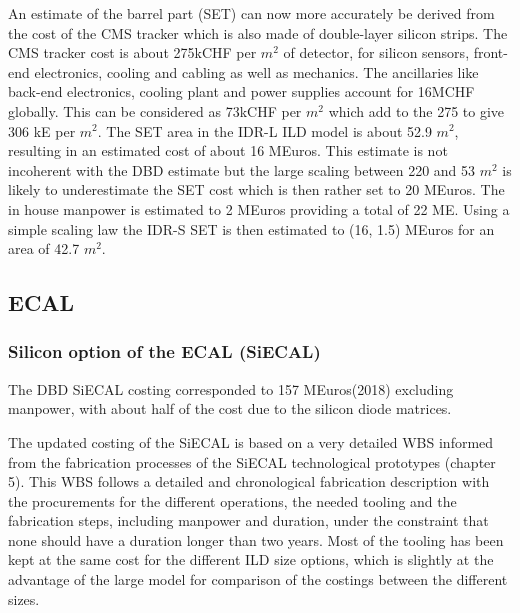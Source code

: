 An estimate of the barrel part (SET) can now more accurately be derived from the cost of the CMS tracker which is also made of double-layer silicon strips. The CMS tracker cost is about 275kCHF per $m^2$ of detector, for silicon sensors, front-end electronics, cooling and cabling as well as mechanics. The ancillaries like back-end electronics, cooling plant and power supplies account for 16MCHF globally. This can be considered  as 73kCHF per $m^2$ which add to the 275 to give 306 kE per $m^2$.
The SET area in the IDR-L ILD model is about 52.9 $m^2$, resulting in an estimated cost of about 16 MEuros. This estimate is not incoherent with the DBD estimate but the large scaling between 220 and 53  $m^2$ is likely to underestimate the SET cost which is then rather set to 20  MEuros. The in house manpower is estimated to 2 MEuros providing a total of 22 ME.
Using a simple scaling law the IDR-S SET is then estimated to (16, 1.5) MEuros for an area of 42.7 $m^2$. 

\subsection{ECAL}
\subsubsection{Silicon option of the ECAL (SiECAL)}
The DBD SiECAL costing corresponded to 157 MEuros(2018) excluding manpower, with about half of the cost due to the silicon diode matrices.

The updated costing of the SiECAL is based on a very detailed WBS informed from the fabrication processes of the SiECAL technological prototypes (chapter 5). This WBS follows a detailed and chronological fabrication description with the procurements for the different operations, the needed tooling and the fabrication steps, including manpower and duration, under the constraint that none should have a duration longer than two years. Most of the tooling has been kept at the same cost for the different ILD size options, which is slightly at the advantage of the large model for comparison of the costings between the different sizes.

